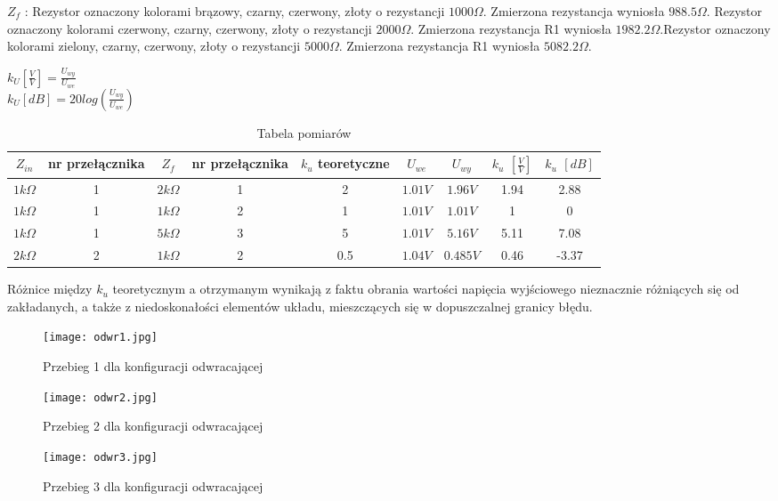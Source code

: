 \documentclass[polish,a4paper]{article}
\begin{document}
$Z_{f}$ :
Rezystor oznaczony kolorami brązowy, czarny, czerwony, złoty o rezystancji $1000\Omega$. Zmierzona rezystancja wyniosła $988.5\Omega$. Rezystor oznaczony kolorami czerwony, czarny, czerwony, złoty o rezystancji $2000\Omega$. Zmierzona rezystancja R1 wyniosła $1982.2\Omega$.Rezystor oznaczony kolorami zielony, czarny, czerwony, złoty o rezystancji $5000\Omega$. Zmierzona rezystancja R1 wyniosła $5082.2\Omega$.

\begin{center}
$k_U[\frac{V}{V}]=\frac{U_{wy}}{U_{we}}$\\
$k_U[dB]=20log(\frac{U_{wy}}{U_{we}})$
\end{center}
\begin{table}[H]
\centering
\begin{tabular}{|c|c|c|c||c|c|c|c|c|}
\hline
$Z_{in}$ &nr przełącznika & $Z_{f}$ & nr przełącznika & $k_{u}$ teoretyczne & $U_{we}$ & $U_{wy}$ & $k_{u}$ $[\frac{V}{V}]$ & $k_{u}$ $[dB]$\\
\hline 
$1k\Omega$ & 1 & $2k\Omega$ & 1 & 2 & $1.01V$ & $1.96V$ & 1.94 & 2.88  \\
\hline
$1k\Omega$ & 1 & $1k\Omega$ & 2 & 1 & $1.01V$ & $1.01V$ & 1 & 0  \\
\hline
$1k\Omega$ & 1 & $5k\Omega$ & 3 & 5 & $1.01V$ & $5.16V$ & 5.11 & 7.08 \\
\hline
$2k\Omega$ & 2 & $1k\Omega$ & 2 & 0.5 & $1.04V$ & $0.485V$ & 0.46 & -3.37 \\
\hline
\end{tabular}
\caption{Tabela pomiarów}
\end{table}

Różnice między $k_u$ teoretycznym a otrzymanym wynikają z faktu obrania wartości napięcia wyjściowego nieznacznie różniących się od zakładanych, a także z niedoskonałości elementów układu, mieszczących się w dopuszczalnej granicy błędu.

\begin{figure}[H]
\centering
\texttt{[image: odwr1.jpg]}
\caption{Przebieg 1 dla konfiguracji odwracającej}
\end{figure}

\begin{figure}[H]
\centering
\texttt{[image: odwr2.jpg]}
\caption{Przebieg 2 dla konfiguracji odwracającej}
\end{figure}

\begin{figure}[H]
\centering
\texttt{[image: odwr3.jpg]}
\caption{Przebieg 3 dla konfiguracji odwracającej}
\end{figure}
\end{document}
